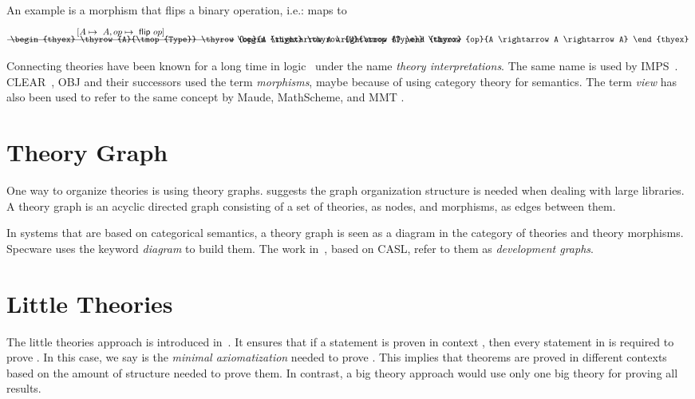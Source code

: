 An example is a morphism that flips a binary operation, i.e.: maps  to 
\begin{equation}\label{eq:flipmagmaview}
\begin{tikzpicture}[node distance=9.0cm, auto,baseline=(current bounding box.center)]
\node (P) {$
    \begin{thyex}
    \thyrow{A}{\tmop{Type}}
    \thyrow{op}{A \rightarrow A \rightarrow A}
    \end{thyex} $};
\node (B) [right of=P] {$
    \begin{thyex}
    \thyrow{U}{\tmop{Type}}
    \thyrow{op}{A \rightarrow A \rightarrow A}
    \end{thyex} $};
\draw[->] (P) to node {$[A \mapsto\ A,
    op \mapsto\ \mathsf{flip}\ op]$} (B);
\end{tikzpicture}
\end{equation}

Connecting theories have been known for a long time in logic~\cite{tarski1953undecidable, enderton1972mathematical} under the name \emph{theory interpretations}. The same name is used by IMPS~\cite{farmer1993imps, InterpIMPS1994}. CLEAR~\cite{Goguen1980}, OBJ and their successors used the term \emph{morphisms}, maybe because of using category theory for semantics. The term \emph{view} has also been used to refer to the same concept by Maude, MathScheme, and MMT . 

\section{Theory Graph}\label{sec:background:theorygraph}
One way to organize theories is using theory graphs. \cite{kohlhase2010towards} suggests the graph organization structure is needed when dealing with large libraries. A theory graph is an acyclic directed graph consisting of a set of theories, as nodes, and morphisms, as edges between them. 

In systems that are based on categorical semantics, a theory graph is seen as a diagram in the category of theories and theory morphisms. Specware uses the keyword \emph{diagram} to build them. The work in~\cite{developmentGraph2000}, based on CASL, refer to them as \emph{development graphs}. 


\section{Little Theories}
The little theories approach is introduced in~\cite{LittleTheories}. It ensures that if a statement  is proven in context \lstmath{$\Gamma$}, then every statement in \lstmath{$\Gamma$} is required to prove . In this case, we say \lstmath{$\Gamma$} is the \emph{minimal axiomatization} needed to prove . This implies that theorems are proved in different contexts based on the amount of structure needed to prove them. In contrast, a big theory approach would use only one big theory for proving all results. 

